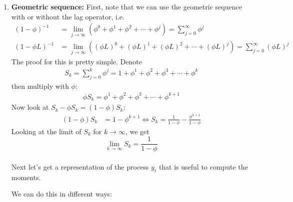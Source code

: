 \begin{enumerate}

\item \textbf{Geometric sequence:} First, note that we can use the geometric sequence with or without the lag operator, i.e.
\begin{align*}
{(1-\phi)}^{-1} &= \lim\limits_{j\rightarrow \infty}(\phi^0 + \phi^1 + \phi^2 + \cdots + \phi^j) = \sum_{j=0}^\infty \phi^j
\\
{(1-\phi L)}^{-1} &= \lim\limits_{j\rightarrow \infty}({(\phi L)}^0 + {(\phi L)}^1 + {(\phi L)}^2 + \cdots + {(\phi L)}^j) = \sum_{j=0}^\infty {(\phi L)}^j
\end{align*}
The proof for this is pretty simple. Denote
\begin{align*}
S_{k} =	\sum_{j=0}^{k} \phi^j =	1 + \phi^1 + \phi^2 + \phi^3 + \cdots + \phi^k
\end{align*}
then multiply with \(\phi\):
\begin{align*}
\phi S_k = \phi^1 + \phi^2 + \phi^3 + \cdots + \phi^{k+1}
\end{align*}
Now look at \(S_k - \phi S_k = (1 - \phi) S_{k}\):
\begin{align*}
(1-\phi) S_{k} &= 1 - \phi^{k+1}
\Leftrightarrow
S_{k}	= \frac{1}{1 - \phi} - \frac{\phi^{k+1}}{1-\phi}
\end{align*} 
Looking at the limit of \(S_{k}\) for \(k \to \infty \), we get
\[\lim\limits_{k \to \infty} S_{k} = \frac{1}{1 - \phi}\]
\\
Next let's get a representation of the process \(y_t\) that is useful to compute the moments.

We can do this in different ways:
    \begin{itemize}


\end{itemize}
\end{enumerate}
